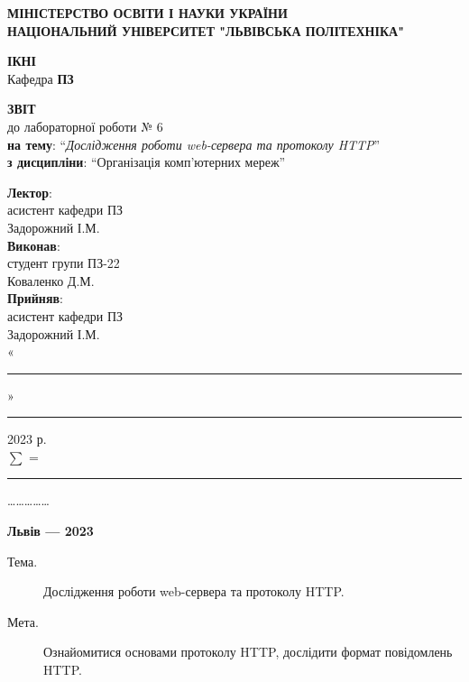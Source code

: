 \documentclass{article}
\newcommand\subject{Організація комп’ютерних мереж}
\newcommand\lecturer{асистент кафедри ПЗ \\ Задорожний І.М.}
\newcommand\teacher{асистент кафедри ПЗ \\ Задорожний І.М.}
\newcommand\mygroup{ПЗ-22}
\newcommand\lab{6}
\newcommand\theme{Дослідження роботи web-сервера та протоколу HTTP}
\newcommand\purpose{Ознайомитися основами протоколу HTTP, дослідити формат
	повідомлень HTTP}
\begin{document}
\begin{normalsize}
	\begin{titlepage}
		\thispagestyle{empty}
		\begin{center}
			\textbf{МІНІСТЕРСТВО ОСВІТИ І НАУКИ УКРАЇНИ\\
				НАЦІОНАЛЬНИЙ УНІВЕРСИТЕТ "ЛЬВІВСЬКА ПОЛІТЕХНІКА"}
		\end{center}
		\begin{flushright}
			\textbf{ІКНІ}\\
			Кафедра \textbf{ПЗ}
		\end{flushright}
		\vspace{200pt}
		\begin{center}
			\textbf{ЗВІТ}\\
			\vspace{10pt}
			до лабораторної роботи № \lab\\
			\textbf{на тему}: “\textit{\theme}”\\
			\textbf{з дисципліни}: “\subject”
		\end{center}
		\vspace{112pt}
		\begin{flushright}
			
			\textbf{Лектор}:\\
			\lecturer\\
			\vspace{28pt}
			\textbf{Виконав}:\\
			
			студент групи \mygroup\\
			Коваленко Д.М.\\
			\vspace{28pt}
			\textbf{Прийняв}:\\
			
			\teacher\\
			
			\vspace{28pt}
			«\rule{1cm}{0.15mm}» \rule{1.5cm}{0.15mm} 2023 р.\\
			$\sum$ = \rule{1cm}{0.15mm}……………\\
			
		\end{flushright}
		\vspace{\fill}
		\begin{center}
			\textbf{Львів — 2023}
		\end{center}
	\end{titlepage}
		
	\begin{description}
		\item[Тема.] \theme.
		\item[Мета.] \purpose.
	\end{description}


\end{normalsize}
\end{document}
